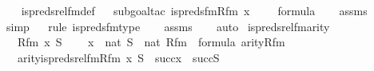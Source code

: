 \begin{isabellebody}
%
\isadelimproof
\isanewline
\ \ %
\endisadelimproof
%
\isatagproof
{}\isamarkupfalse%
\ is{\isacharunderscore}{\kern0pt}preds{\isacharunderscore}{\kern0pt}rel{\isacharunderscore}{\kern0pt}fm{\isacharunderscore}{\kern0pt}def\isanewline
\ \ \isamarkupfalse%
{\isacharparenleft}{\kern0pt}subgoal{\isacharunderscore}{\kern0pt}tac\ {\isachardoublequoteopen}is{\isacharunderscore}{\kern0pt}preds{\isacharunderscore}{\kern0pt}fm{\isacharparenleft}{\kern0pt}Rfm{\isacharcomma}{\kern0pt}\ x\ {\isacharhash}{\kern0pt}{\isacharplus}{\kern0pt}\ {}{\isacharcomma}{\kern0pt}\ {}{\isacharparenright}{\kern0pt}\ {\isasymin}\ formula{\isachardoublequoteclose}{\isacharparenright}{\kern0pt}\isanewline
\ \ \isamarkupfalse%
\ assms\ \isanewline
\ \ \ \isamarkupfalse%
\ simp\isanewline
\ \ \isamarkupfalse%
{\isacharparenleft}{\kern0pt}rule\ is{\isacharunderscore}{\kern0pt}preds{\isacharunderscore}{\kern0pt}fm{\isacharunderscore}{\kern0pt}type{\isacharparenright}{\kern0pt}\isanewline
\ \ \isamarkupfalse%
\ assms\isanewline
\ \ \isamarkupfalse%
\ auto%
\endisatagproof
{\isafoldproof}%
%
\isadelimproof
\isanewline
%
\endisadelimproof
\isanewline
{}\isamarkupfalse%
\ is{\isacharunderscore}{\kern0pt}preds{\isacharunderscore}{\kern0pt}rel{\isacharunderscore}{\kern0pt}fm{\isacharunderscore}{\kern0pt}arity\ {\isacharcolon}{\kern0pt}\ \isanewline
\ \ \ Rfm\ x\ S\ \isanewline
\ \ \ {\isachardoublequoteopen}x\ {\isasymin}\ nat{\isachardoublequoteclose}\ {\isachardoublequoteopen}S\ {\isasymin}\ nat{\isachardoublequoteclose}\ {\isachardoublequoteopen}Rfm\ {\isasymin}\ formula{\isachardoublequoteclose}\ {\isachardoublequoteopen}arity{\isacharparenleft}{\kern0pt}Rfm{\isacharparenright}{\kern0pt}\ {\isacharequal}{\kern0pt}\ {}{\isachardoublequoteclose}\isanewline
\ \ \ {\isachardoublequoteopen}arity{\isacharparenleft}{\kern0pt}is{\isacharunderscore}{\kern0pt}preds{\isacharunderscore}{\kern0pt}rel{\isacharunderscore}{\kern0pt}fm{\isacharparenleft}{\kern0pt}Rfm{\isacharcomma}{\kern0pt}\ x{\isacharcomma}{\kern0pt}\ S{\isacharparenright}{\kern0pt}{\isacharparenright}{\kern0pt}\ {\isasymle}\ succ{\isacharparenleft}{\kern0pt}x{\isacharparenright}{\kern0pt}\ {\isasymunion}\ succ{\isacharparenleft}{\kern0pt}S{\isacharparenright}{\kern0pt}{\isachardoublequoteclose}\isanewline
%
\isadelimproof
\isanewline
\ \ %
\endisadelimproof
%
\isatagproof
{}\isamarkupfalse%

\end{isabellebody}
